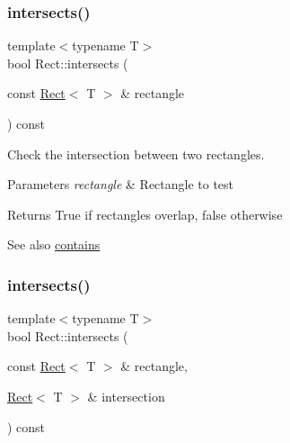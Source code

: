 \subsubsection{\texorpdfstring{intersects()}{intersects()}\hspace{0.1cm}{\footnotesize\ttfamily [1/2]}}
{\footnotesize\ttfamily template$<$typename T$>$ \\
bool Rect\+::intersects (\begin{DoxyParamCaption}\item[{const \mbox{\hyperlink{classsf_1_1_rect}{Rect}}$<$ T $>$ \&}]{rectangle }\end{DoxyParamCaption}) const}



Check the intersection between two rectangles. 


\begin{DoxyParams}{Parameters}
{\em rectangle} & Rectangle to test\\
\hline
\end{DoxyParams}
\begin{DoxyReturn}{Returns}
True if rectangles overlap, false otherwise
\end{DoxyReturn}
\begin{DoxySeeAlso}{See also}
\mbox{\hyperlink{classsf_1_1_rect_a1d8a4a3aecec18310f6e3e23db43dfb8}{contains}} \begin{DoxyVerb}\end{DoxyVerb}
 
\end{DoxySeeAlso}
\mbox{\label{classsf_1_1_rect_a555557c511ad6bfe0359a97c0ce1a003}} 
\subsubsection{\texorpdfstring{intersects()}{intersects()}\hspace{0.1cm}{\footnotesize\ttfamily [2/2]}}
{\footnotesize\ttfamily template$<$typename T$>$ \\
bool Rect\+::intersects (\begin{DoxyParamCaption}\item[{const \mbox{\hyperlink{classsf_1_1_rect}{Rect}}$<$ T $>$ \&}]{rectangle,  }\item[{\mbox{\hyperlink{classsf_1_1_rect}{Rect}}$<$ T $>$ \&}]{intersection }\end{DoxyParamCaption}) const}



